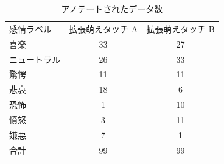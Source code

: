 \begin{table}[!h]
\vspace{20mm}
\begin{center}
\caption{アノテートされたデータ数} %
\label{table:data_moe_aug} %
\begin{tabular}{lcc}
\hline
\multirow{2}{*}{感情ラベル} & \multirow{2}{*}{拡張萌えタッチ A} & \multirow{2}{*}{拡張萌えタッチ B} \\
 &  &  \\ \hline
喜楽 & 33 & 27 \\ \hline
ニュートラル & 26 & 33 \\
驚愕 & 11 & 11 \\
悲哀 & 18 & 6 \\
恐怖 & 1 & 10 \\
憤怒 & 3 & 11 \\
嫌悪 & 7 & 1 \\ \hline
合計 & 99 & 99
\end{tabular}
\end{center}
\vspace{10mm}
\end{table}


